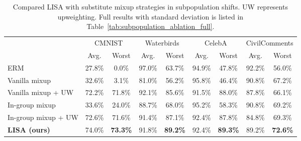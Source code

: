 \begin{table*}[h]
\small
\caption{Compared LISA with substitute mixup strategies in subpopulation shifts. UW represents upweighting. Full results with standard deviation is listed in Table~\ref{tab:subpopulation_ablation_full}.}
\label{tab:subpopulation_ablation}
\begin{center}
\begin{tabular}{l|cc|cc|cc|cc}
\toprule
\multirow{2}{*}{} & \multicolumn{2}{c|}{CMNIST} & \multicolumn{2}{c|}{Waterbirds} & \multicolumn{2}{c|}{CelebA} & \multicolumn{2}{c}{CivilComments}\\
& Avg. & Worst  & Avg. & Worst  & Avg. & Worst & Avg. & Worst \\\midrule
ERM & 27.8\% & 0.0\% & 97.0\% & 63.7\% & 94.9\% & 47.8\% & 92.2\% & 56.0\% \\
Vanilla mixup & 32.6\% & 3.1\% &  81.0\% & 56.2\% & 95.8\% & 46.4\% & 90.8\% & 67.2\% \\
Vanilla mixup + UW & 72.2\% & 71.8\% & 92.1\% & 85.6\% & 91.5\% & 88.0\% & 87.8\% & 66.1\% \\
In-group mixup & 33.6\% & 24.0\% & 88.7\% & 68.0\% & 95.2\% & 58.3\% & 90.8\% & 69.2\% \\
In-group mixup + UW & 72.6\% & 71.6\% & 91.4\% & 87.1\%  & 92.4\%  & 87.8\% & 84.8\% & 69.3\%  \\
\midrule
\textbf{LISA (ours)} & 74.0\% & \textbf{73.3\%} & 91.8\% & \textbf{89.2\%} & 92.4\% & \textbf{89.3\%} & 89.2\% & \textbf{72.6\%} \\
\bottomrule
\end{tabular}
\end{center}
\vspace{-1em}
\end{table*}

